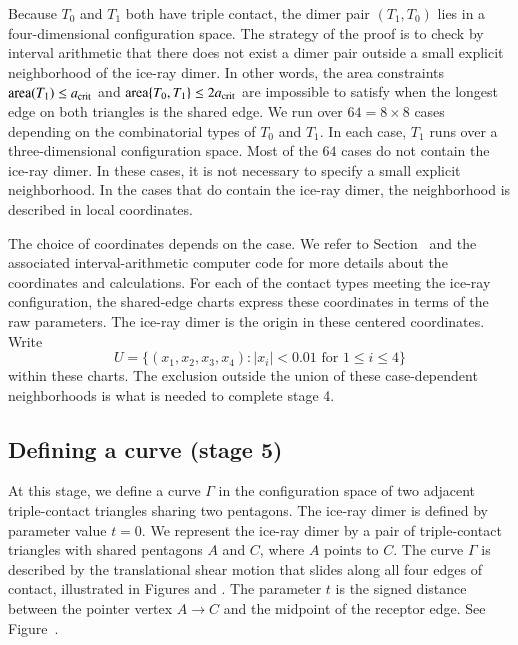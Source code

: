 Because $T_0$ and $T_1$ both have triple contact, the dimer pair
$(T_1,T_0)$ lies in a four-dimensional configuration space.  The
strategy of the proof is to check by interval arithmetic that there does not
exist a dimer pair outside a small explicit neighborhood of the
ice-ray dimer.  In other words, the area constraints ${\operatorname{area}}(T_1)\le
a_\text{crit}$ and ${\operatorname{area}}\{T_0,T_1\}\le2a_\text{crit}$ are impossible to satisfy
when the longest edge on both triangles is the shared edge.  We run
over $64 = 8\times 8$ cases depending on the combinatorial types of
$T_0$ and $T_1$.  In each case, $T_1$ runs over a three-dimensional
configuration space.  Most of the $64$ cases do not contain the
ice-ray dimer.  In these cases, it is not necessary to specify a small
explicit neighborhood.  In the cases that do contain the ice-ray
dimer, the neighborhood is described in local coordinates.

The choice of coordinates depends on the case.  We refer to
Section~ and the associated interval-arithmetic computer code
for more details about the coordinates and calculations.
For each of the contact types meeting the ice-ray configuration,
the shared-edge charts express these coordinates in terms of the
raw parameters.  The ice-ray dimer is the origin in these centered
coordinates.  Write
\[
U=\{(x_1,x_2,x_3,x_4): |x_i|<0.01\text{ for }1\le i\le4\}
\]
within these charts.  The exclusion outside the union of these
case-dependent neighborhoods is
what is needed to complete stage 4.

\subsection{Defining a curve (stage 5)}

At this stage, we define a curve $\Gamma$ in the configuration space
of two adjacent triple-contact triangles sharing two pentagons.
The ice-ray dimer is defined by
parameter value $t=0$.  We represent the ice-ray dimer by a pair of
triple-contact triangles with shared pentagons $A$ and $C$, where $A$
points to $C$.  The curve $\Gamma$ is described by the translational shear motion that
slides along all four edges of contact, illustrated in Figures
 and .
The parameter $t$ is the signed distance between the pointer vertex
$A\to C$ and the midpoint of the receptor edge.
See Figure~.

